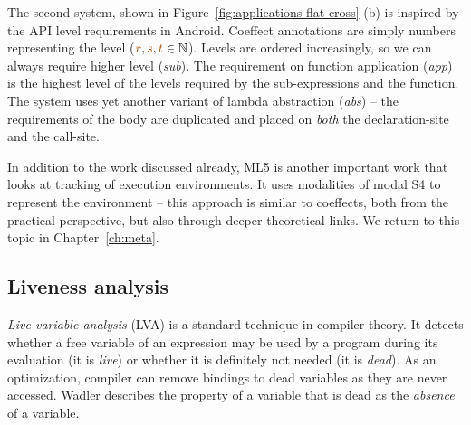 The second system, shown in Figure~\ref{fig:applications-flat-cross} (b) is inspired by the API
level requirements in Android. Coeffect annotations are simply numbers representing the level
($\aclrd{r}, \aclrd{s}, \aclrd{t} \in \mathbb{N}$). Levels are ordered increasingly, so we can
always require higher level (\emph{sub}). The requirement on function application (\emph{app}) is
the highest level of the levels required by the sub-expressions and the function. The system uses 
yet another variant of lambda abstraction (\emph{abs}) -- the requirements of the body are duplicated
and placed on \emph{both} the declaration-site and the call-site.

In addition to the work discussed already, ML5 \cite{app-distributed-ml5} is another important work 
that looks at tracking of execution environments. It uses modalities of modal S4 to represent the 
environment -- this approach is similar to coeffects, both from the practical perspective, but also 
through deeper theoretical links. We return to this topic in Chapter~\ref{ch:meta}.


\subsection{Liveness analysis}
\label{sec:applications-flat-live}

\emph{Live variable analysis} (LVA) \cite{app-modern-compiler} is a standard technique in compiler 
theory. It detects whether a free variable of an expression may be used by a program during its
evaluation (it is \emph{live}) or whether it is definitely not needed (it is \emph{dead}). As an 
optimization, compiler can remove bindings to dead variables as they are never accessed. Wadler 
\cite{app-strictness-absecnce} describes the property of a variable that is dead as the 
\emph{absence} of a variable. 

